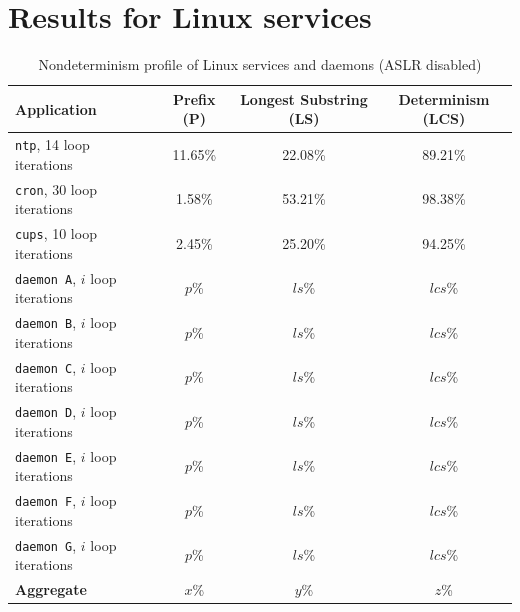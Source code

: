 
\section{Results for Linux services} \label{bootresults}

\begin{table}[h]
\caption{Nondeterminism profile of Linux services and daemons (ASLR disabled)}
\label{hw:stats}
\begin{center}
\begin{tabular}{||l|c|c|c||}\hline
  Application & Prefix (P) & Longest Substring (LS) &
  Determinism (LCS) \\
  \hline \hline
  \texttt{ntp}, 14 loop iterations & 11.65\% & 22.08\% & 89.21\%
  \\\hline
  \texttt{cron}, 30 loop iterations & 1.58\% & 53.21\% & 98.38\% 
  \\\hline 
  \texttt{cups}, 10 loop iterations & 2.45\% & 25.20\% & 94.25\%
  \\\hline 
  \texttt{daemon A}, $i$ loop iterations & $p$\% & $ls$\% & $lcs$\%
  \\\hline 
  \texttt{daemon B}, $i$ loop iterations & $p$\% & $ls$\% & $lcs$\%
  \\\hline 
  \texttt{daemon C}, $i$ loop iterations & $p$\% & $ls$\% & $lcs$\%
  \\\hline 
  \texttt{daemon D}, $i$ loop iterations & $p$\% & $ls$\% & $lcs$\%
  \\\hline 
  \texttt{daemon E}, $i$ loop iterations & $p$\% & $ls$\% & $lcs$\%
  \\\hline 
  \texttt{daemon F}, $i$ loop iterations & $p$\% & $ls$\% & $lcs$\%
  \\\hline 
  \texttt{daemon G}, $i$ loop iterations & $p$\% & $ls$\% & $lcs$\%
  \\\hline 
  \hline 
  {\bf Aggregate} & {\bf $x$}\% & {\bf $y$}\% & {\bf $z$}\%
  \\\hline 

\end{tabular}
\end{center}
\end{table}

